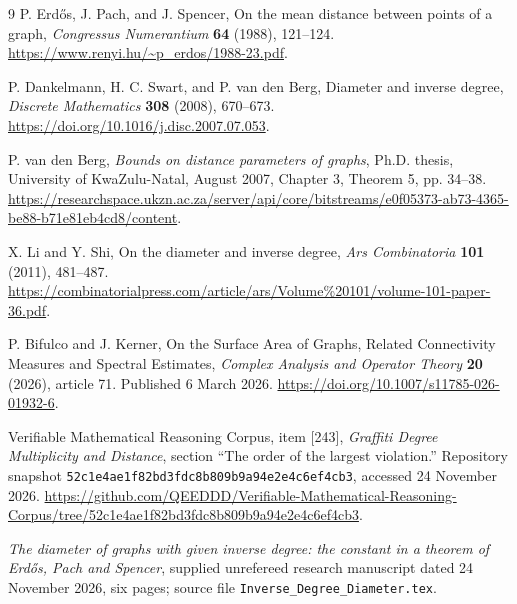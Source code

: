 \documentclass[11pt]{amsart}
\theoremstyle{definition}
\theoremstyle{remark}
\begin{document}
\clearpage
\begin{thebibliography}{9}
P. Erd\H{o}s, J. Pach, and J. Spencer,
On the mean distance between points of a graph,
\emph{Congressus Numerantium} \textbf{64} (1988), 121--124.
\url{https://www.renyi.hu/~p_erdos/1988-23.pdf}.

P. Dankelmann, H. C. Swart, and P. van den Berg,
Diameter and inverse degree,
\emph{Discrete Mathematics} \textbf{308} (2008), 670--673.
\url{https://doi.org/10.1016/j.disc.2007.07.053}.

P. van den Berg, \emph{Bounds on distance parameters of graphs},
Ph.D. thesis, University of KwaZulu-Natal, August 2007,
Chapter 3, Theorem 5, pp. 34--38.
\url{https://researchspace.ukzn.ac.za/server/api/core/bitstreams/e0f05373-ab73-4365-be88-b71e81eb4cd8/content}.

X. Li and Y. Shi, On the diameter and inverse degree,
\emph{Ars Combinatoria} \textbf{101} (2011), 481--487.
\url{https://combinatorialpress.com/article/ars/Volume%20101/volume-101-paper-36.pdf}.

P. Bifulco and J. Kerner,
On the Surface Area of Graphs, Related Connectivity Measures and Spectral Estimates,
\emph{Complex Analysis and Operator Theory} \textbf{20} (2026), article 71.
Published 6 March 2026.
\url{https://doi.org/10.1007/s11785-026-01932-6}.

Verifiable Mathematical Reasoning Corpus, item [243],
\emph{Graffiti Degree Multiplicity and Distance},
section ``The order of the largest violation.''
Repository snapshot \texttt{52c1e4ae1f82bd3fdc8b809b9a94e2e4c6ef4cb3},
accessed 24 November 2026.
\url{https://github.com/QEEDDD/Verifiable-Mathematical-Reasoning-Corpus/tree/52c1e4ae1f82bd3fdc8b809b9a94e2e4c6ef4cb3}.

\emph{The diameter of graphs with given inverse degree: the constant in a
theorem of Erd\H{o}s, Pach and Spencer}, supplied unrefereed research
manuscript dated 24 November 2026, six pages; source file
\texttt{Inverse\_Degree\_Diameter.tex}.
\end{thebibliography}
\end{document}
